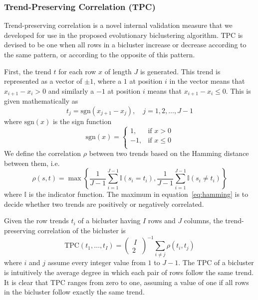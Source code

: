 
\subsubsection{Trend-Preserving Correlation (TPC)}
Trend-preserving correlation is a novel internal validation measure that we developed for use in the proposed evolutionary biclustering algorithm.
TPC is devised to be one when all rows in a bicluster increase or decrease according to the same pattern, or according to the opposite of this pattern.

First, the trend $t$ for each row $x$ of length $J$ is generated. This trend is represented as a vector of $\pm 1$, where a $1$ at position $i$ in the vector means that $x_{i+1}-x_i > 0$ and similarly a $-1$ at position $i$ means that $x_{i+1}-x_i \le 0$. This is given mathematically as
\begin{equation}
	t_j = \text{sgn}(x_{j+1}-x_j), \quad j = 1, 2, \dots, J-1
\end{equation}
where $\text{sgn}(x)$ is the sign function
\[
	\text{sgn}(x) = \left\{\begin{array}{lr}
        1, & \text{if } x > 0\\
        -1, & \text{if } x \le 0\\
        \end{array}\right.
\]
We define the correlation $\rho$ between two trends based on the Hamming distance between them, i.e.
\begin{equation} \label{eq:hamming}
	\rho(s, t) = \max\left\{ \frac{1}{J-1}\sum_{i=1}^{J-1} \mathbb{I}(s_i = t_i), \frac{1}{J-1}\sum_{i=1}^{J-1} \mathbb{I}(s_i \ne t_i) \right\}
\end{equation}
where $\mathbb{I}$ is the indicator function. The maximum in equation~\ref{eq:hamming} is to decide whether two trends are positively or negatively correlated.

Given the row trends $t_i$ of a bicluster having $I$ rows and $J$ columns, the trend-preserving correlation of the bicluster is
\begin{equation}
	\text{TPC}(t_1, \dots, t_I) = \begin{pmatrix}\ I\ \\2\end{pmatrix}^{-1}\sum_{i \ne j} \rho(t_i, t_j)
\end{equation}
where $i$ and $j$ assume every integer value from $1$ to $J-1$. The TPC of a bicluster is intuitively the average degree in which each pair of rows follow the same trend. It is clear that TPC ranges from zero to one, assuming a value of one if all rows in the bicluster follow exactly the same trend.


